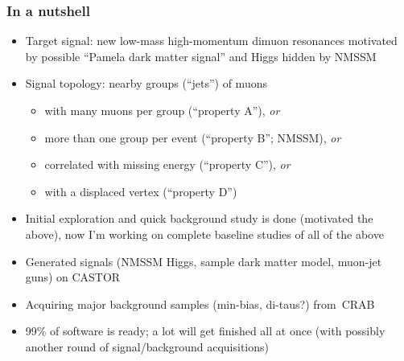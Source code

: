 \documentclass[compress]{beamer}
\begin{document}
\begin{frame}
\frametitle{In a nutshell}
\begin{itemize}
\item Target signal: new low-mass high-momentum dimuon resonances
  motivated by possible ``Pamela dark matter signal'' and Higgs hidden by NMSSM

\item Signal topology: nearby groups (``jets'') of muons
\begin{itemize}
\item with many muons per group (``property A''), {\it or}
\item more than one group per event (``property B''; NMSSM), {\it or}
\item correlated with missing energy (``property C''), {\it or}
\item with a displaced vertex (``property D'')
\end{itemize}

\item Initial exploration and quick background study is done
  (motivated the above), now I'm working on complete baseline studies
  of all of the above

\item Generated signals (NMSSM Higgs, sample dark matter model, muon-jet guns) on CASTOR

\item Acquiring major background samples (min-bias, di-taus?) \mbox{from CRAB\hspace{-1 cm}}

\item 99\% of software is ready; a lot will get finished all at once
  (with possibly another round of signal/background acquisitions)
\end{itemize}
\end{frame}
\end{document}
